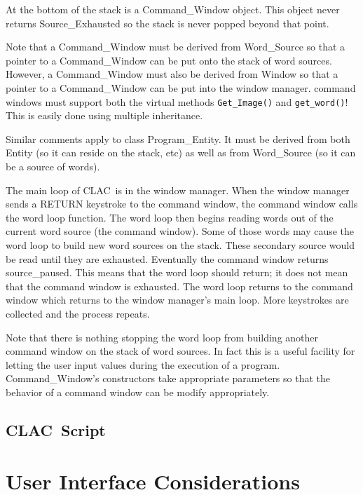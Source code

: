 \documentclass{report}
\newcommand{\CLAC}{CLAC}
\begin{document}
At the bottom of the stack is a Command\_Window object. This object never returns Source\_Exhausted so the stack is never popped beyond that point.

Note that a Command\_Window must be derived from Word\_Source so that a pointer to a Command\_Window can be put onto the stack of word sources. However, a Command\_Window must also be derived from Window so that a pointer to a Command\_Window can be put into the window manager. command windows must support both the virtual methods \texttt{Get\_Image()} and \texttt{get\_word()}! This is easily done using multiple inheritance.

Similar comments apply to class Program\_Entity. It must be derived from both Entity (so it can reside on the stack, etc) as well as from Word\_Source (so it can be a source of words).

The main loop of \CLAC\ is in the window manager. When the window manager sends a RETURN keystroke to the command window, the command window calls the word loop function. The word loop then begins reading words out of the current word source (the command window). Some of those words may cause the word loop to build new word sources on the stack. These secondary source would be read until they are exhausted. Eventually the command window returns source\_paused. This means that the word loop should return; it does not mean that the command window is exhausted. The word loop returns to the command window which returns to the window manager's main loop. More keystrokes are collected and the process repeats.

Note that there is nothing stopping the word loop from building another command window on the stack of word sources. In fact this is a useful facility for letting the user input values during the execution of a program. Command\_Window's constructors take appropriate parameters so that the behavior of a command window can be modify appropriately.

\section{\CLAC\ Script}

\chapter{User Interface Considerations}
\end{document}
